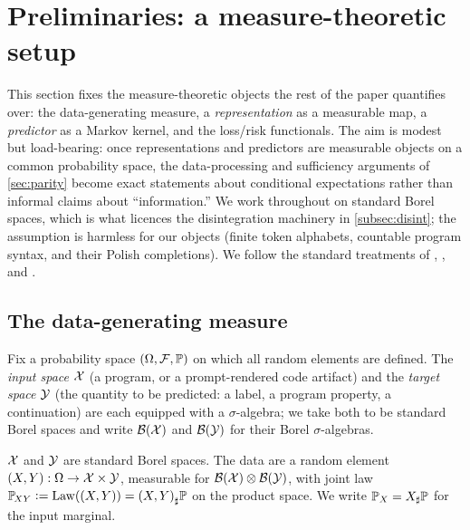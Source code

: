 \section{Preliminaries: a measure-theoretic setup}
\label{sec:prelim}


This section fixes the measure-theoretic objects the rest of the paper
quantifies over: the data-generating measure, a \emph{representation} as a
measurable map, a \emph{predictor} as a Markov kernel, and the loss/risk
functionals. The aim is modest but load-bearing: once representations and
predictors are measurable objects on a common probability space, the
data-processing and sufficiency arguments of \cref{sec:parity} become exact
statements about conditional expectations rather than informal claims about
``information.'' We work throughout on standard Borel spaces, which is what
licences the disintegration machinery in \cref{subsec:disint}; the assumption
is harmless for our objects (finite token alphabets, countable program
syntax, and their Polish completions). We follow the standard treatments of
\citet{folland1999real}, \citet{kallenberg2002foundations}, and
\citet{cinlar2011probability}.

\subsection{The data-generating measure}
\label{subsec:dgm}

Fix a probability space $(\Omega, \mathcal{F}, \mathbb{P})$ on which all random
elements are defined. The \emph{input space} $\mathcal{X}$ (a program, or a
prompt-rendered code artifact) and the \emph{target space} $\mathcal{Y}$ (the
quantity to be predicted: a label, a program property, a continuation) are
each equipped with a $\sigma$-algebra; we take both to be standard Borel
spaces and write $\mathcal{B}(\mathcal{X})$ and $\mathcal{B}(\mathcal{Y})$ for their Borel
$\sigma$-algebras.

\begin{assumption}
\label{ass:sbs}
$\mathcal{X}$ and $\mathcal{Y}$ are standard Borel spaces. The data are a random
element $(X, Y) : \Omega \to \mathcal{X} \times \mathcal{Y}$, measurable for
$\mathcal{B}(\mathcal{X}) \otimes \mathcal{B}(\mathcal{Y})$, with joint law
$\mathbb{P}_{\!XY} \vcentcolon= \mathrm{Law}((X,Y)) = {(X,Y)}_{\sharp}\mathbb{P}$ on the product space. We
write $\mathbb{P}_X = {X}_{\sharp}\mathbb{P}$ for the input marginal.
\end{assumption}

